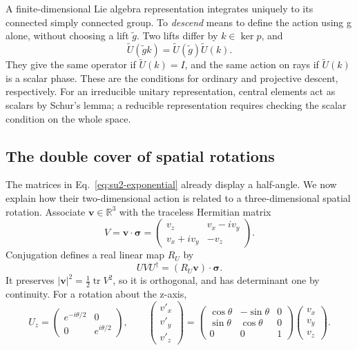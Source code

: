 \documentclass[11pt]{article}
\newcommand{\R}{\mathbb{R}}
\newcommand{\tr}{\operatorname{tr}}
\begin{document}
A finite-dimensional Lie algebra representation integrates uniquely to
its connected simply connected group. To \emph{descend} means to define
the action using g alone, without choosing a lift \(\widetilde g\).
Two lifts differ by \(k\in\ker p\), and
\[
 \widetilde U(\widetilde g k)
 =\widetilde U(\widetilde g)\widetilde U(k).
\]
They give the same operator if \(\widetilde U(k)=I\), and the same
action on rays if \(\widetilde U(k)\) is a scalar phase. These are the
conditions for ordinary and projective descent, respectively.
For an irreducible unitary
representation, central elements act as scalars by Schur's lemma;
a reducible representation requires checking the scalar condition on the
whole space.

\subsection{The double cover of spatial rotations}
The matrices in Eq.~\eqref{eq:su2-exponential} already display a
half-angle. We now explain how their two-dimensional action is related
to a three-dimensional spatial rotation.
Associate \(\bm v\in\R^3\) with the traceless Hermitian matrix
\[
 V=\bm v\cdot\bm\sigma
 =\begin{pmatrix}v_z&v_x-iv_y\\v_x+iv_y&-v_z\end{pmatrix}.
\]
Conjugation defines a real linear map \(R_U\) by
\begin{equation}
 UVU^\dagger=(R_U\bm v)\cdot\bm\sigma.
 \label{eq:su2-cover}
\end{equation}
It preserves \(|\bm v|^2=\tfrac12\tr V^2\), so it is orthogonal, and
has determinant one by continuity. For a rotation about the z-axis,
\[
 U_z=\begin{pmatrix}e^{-i\theta/2}&0\\0&e^{i\theta/2}\end{pmatrix},
 \qquad
 \begin{pmatrix}v'_x\\v'_y\\v'_z\end{pmatrix}
 =\begin{pmatrix}\cos\theta&-\sin\theta&0\\
 \sin\theta&\cos\theta&0\\0&0&1\end{pmatrix}
 \begin{pmatrix}v_x\\v_y\\v_z\end{pmatrix}.
\]
\end{document}
